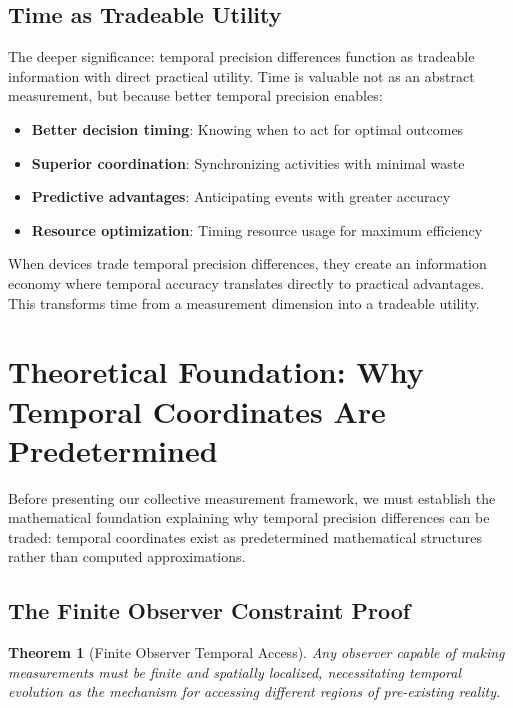 \documentclass[12pt,a4paper]{article}
\newtheorem{theorem}{Theorem}[section]
\begin{document}
\subsection{Time as Tradeable Utility}

The deeper significance: temporal precision differences function as tradeable information with direct practical utility. Time is valuable not as an abstract measurement, but because better temporal precision enables:

\begin{itemize}
\item \textbf{Better decision timing}: Knowing when to act for optimal outcomes
\item \textbf{Superior coordination}: Synchronizing activities with minimal waste
\item \textbf{Predictive advantages}: Anticipating events with greater accuracy
\item \textbf{Resource optimization}: Timing resource usage for maximum efficiency
\end{itemize}

When devices trade temporal precision differences, they create an information economy where temporal accuracy translates directly to practical advantages. This transforms time from a measurement dimension into a tradeable utility.

\section{Theoretical Foundation: Why Temporal Coordinates Are Predetermined}

Before presenting our collective measurement framework, we must establish the mathematical foundation explaining why temporal precision differences can be traded: temporal coordinates exist as predetermined mathematical structures rather than computed approximations.

\subsection{The Finite Observer Constraint Proof}

\begin{theorem}[Finite Observer Temporal Access]
Any observer capable of making measurements must be finite and spatially localized, necessitating temporal evolution as the mechanism for accessing different regions of pre-existing reality.
\end{theorem}
\end{document}
